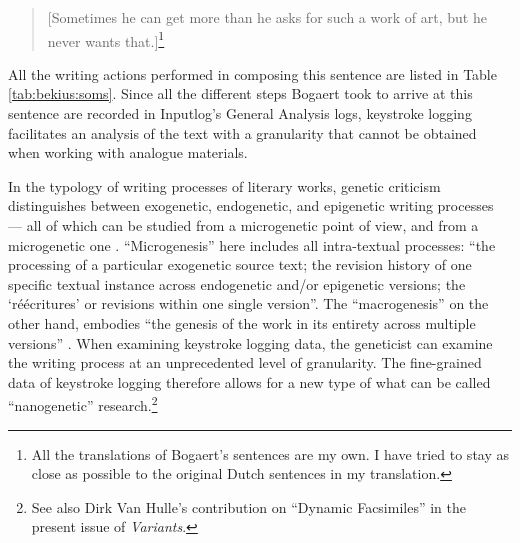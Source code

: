 \begin{paper}
\begin{quote}
[Sometimes he can get more than he asks for such a work of
art, but he never wants that.]\footnote{All the translations of
  Bogaert's sentences are my own. I have tried to stay as close as
  possible to the original Dutch sentences in my translation.}
\end{quote} 

\noindent
All the writing actions
performed in composing this sentence are listed in Table \ref{tab:bekius:soms}. Since all
the different steps Bogaert took to arrive at this sentence are recorded in Inputlog's General Analysis logs, keystroke logging facilitates an
analysis of the text with a granularity that cannot be obtained when working with analogue materials.

In the typology of writing processes of literary works, genetic criticism distinguishes
between exogenetic, endogenetic, and epigenetic writing processes --- all of which
can be studied from a microgenetic point of view, and from a microgenetic one \citep{biasi_what_1996,van_hulle_modelling_2016}. ``Microgenesis'' here includes all
intra-textual processes: ``the processing of a particular exogenetic
source text; the revision history of one specific textual instance
across endogenetic and/or epigenetic versions; the `réécritures' or
revisions within one single version''\citep[50]{van_hulle_modelling_2016}. The
``macrogenesis'' on the other hand, embodies ``the genesis of the work in
its entirety across multiple versions'' \citep[50]{van_hulle_modelling_2016}. When
 examining keystroke logging data, the geneticist can examine the writing process at an unprecedented level of granularity.
The fine-grained data of keystroke logging therefore allows for a new
type of what can be called ``nanogenetic'' research.\footnote{See also
  Dirk Van Hulle's contribution on ``Dynamic Facsimiles'' in the present
  issue of \emph{Variants}.} 


\end{paper}
